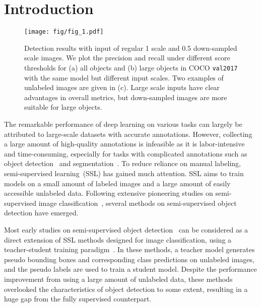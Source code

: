 \documentclass[10pt,twocolumn,letterpaper]{article}
\begin{document}
\section{Introduction}
\begin{figure}[t]
	\centering
\vspace{1em}
	\texttt{[image: fig/fig\_1.pdf]}
    \vspace{-.5em}
	\caption{Detection results with input of regular 1 scale and 0.5 down-sampled scale images.  We plot the precision and recall under different score thresholds for (a) all objects and (b) large objects in COCO \texttt{val2017} with the same model but different input scales. Two examples of unlabeled images are given in (c). Large scale inputs have clear advantages in overall metrics, but down-sampled images are more suitable for large objects.}
	\vspace{-.5em}
	\label{fig:f1}
\end{figure}

The remarkable performance of deep learning on various tasks can largely be attributed to large-scale datasets with accurate annotations. However, collecting a large amount of high-quality annotations is infeasible as it is labor-intensive and time-consuming, especially for tasks with complicated annotations such as object detection~\cite{coco, objects365} and segmentation~\cite{pascalvoc, cityscapes}. To reduce reliance on manual labeling, semi-supervised learning~(SSL) has gained much attention. SSL aims to train models on a small amount of labeled images and a large amount of easily accessible unlabeled data. Following extensive pioneering studies on semi-supervised image classification~\cite{Fixmatch,mixmatch,temporalensembling}, several methods on semi-supervised object detection have emerged.

Most early studies on semi-supervised object detection~\cite{STAC,unbiasedTeacher,CSD} can be considered as a direct extension of SSL methods designed for image classification, using a teacher-student training paradigm~\cite{MeanTeacher,Fixmatch,mixmatch}. In these methods, a teacher model generates pseudo bounding boxes and corresponding class predictions on unlabeled images, and the pseudo labels are used to train a student model. Despite the performance improvement from using a large amount of unlabeled data, these methods overlooked the characteristics of object detection to some extent, resulting in a huge gap from the fully supervised counterpart.
\end{document}
